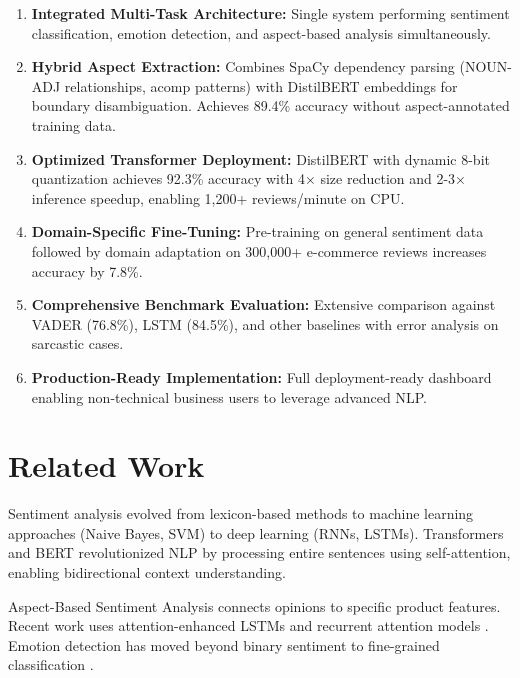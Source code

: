 \documentclass[]{interact}
\theoremstyle{plain}
\theoremstyle{definition}
\theoremstyle{remark}
\begin{document}
\begin{enumerate}
    \item \textbf{Integrated Multi-Task Architecture:} Single system performing sentiment classification, emotion detection, and aspect-based analysis simultaneously.
    
    \item \textbf{Hybrid Aspect Extraction:} Combines SpaCy dependency parsing (NOUN-ADJ relationships, acomp patterns) with DistilBERT embeddings for boundary disambiguation. Achieves 89.4\% accuracy without aspect-annotated training data.
    
    \item \textbf{Optimized Transformer Deployment:} DistilBERT \citep{Sanh19} with dynamic 8-bit quantization achieves 92.3\% accuracy with 4× size reduction and 2-3× inference speedup, enabling 1,200+ reviews/minute on CPU.
    
    \item \textbf{Domain-Specific Fine-Tuning:} Pre-training on general sentiment data followed by domain adaptation on 300,000+ e-commerce reviews \citep{Xu20} increases accuracy by 7.8\%.
    
    \item \textbf{Comprehensive Benchmark Evaluation:} Extensive comparison against VADER (76.8\%), LSTM (84.5\%), and other baselines with error analysis on sarcastic cases.
    
    \item \textbf{Production-Ready Implementation:} Full deployment-ready dashboard enabling non-technical business users to leverage advanced NLP.
\end{enumerate}


\section{Related Work}

Sentiment analysis evolved from lexicon-based methods \citep{Pan02} to machine learning approaches (Naive Bayes, SVM) to deep learning (RNNs, LSTMs). Transformers \citep{Vas17} and BERT \citep{Dev19} revolutionized NLP by processing entire sentences using self-attention, enabling bidirectional context understanding.

Aspect-Based Sentiment Analysis \citep{Liu12} connects opinions to specific product features. Recent work uses attention-enhanced LSTMs \citep{Wan16} and recurrent attention models \citep{Che17}. Emotion detection has moved beyond binary sentiment to fine-grained classification \citep{Moh13, Alh21}.
\end{document}
